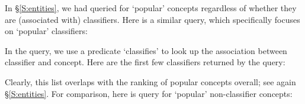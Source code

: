 In \S\ref{S:entities}, we had queried for `popular' concepts regardless of whether they are (associated with) classifiers. Here is a similar query, which specifically focuses on `popular' classifiers:


\noindent
In the query, we use a predicate `classifies' to look up the association between classifier and concept. Here are the first few classifiers returned by the query:


\noindent
Clearly, this list overlaps with the ranking of popular concepts overall; see again \S\ref{S:entities}. For comparison, here is query for `popular' non-classifier concepts:



